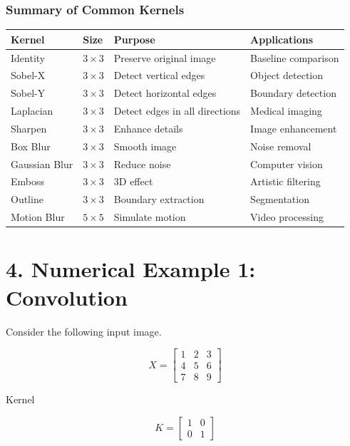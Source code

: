 \documentclass[11pt]{article}
\renewcommand{\arraystretch}{1.3}
\begin{document}
\subsubsection*{Summary of Common Kernels}

\begin{center}
\renewcommand{\arraystretch}{1.3}
\begin{tabular}{|p{3cm}|p{2cm}|p{4cm}|p{4cm}|}
\hline
\textbf{Kernel} & \textbf{Size} & \textbf{Purpose} & \textbf{Applications}\\
\hline
Identity & $3\times3$ & Preserve original image & Baseline comparison\\
\hline
Sobel-X & $3\times3$ & Detect vertical edges & Object detection\\
\hline
Sobel-Y & $3\times3$ & Detect horizontal edges & Boundary detection\\
\hline
Laplacian & $3\times3$ & Detect edges in all directions & Medical imaging\\
\hline
Sharpen & $3\times3$ & Enhance details & Image enhancement\\
\hline
Box Blur & $3\times3$ & Smooth image & Noise removal\\
\hline
Gaussian Blur & $3\times3$ & Reduce noise & Computer vision\\
\hline
Emboss & $3\times3$ & 3D effect & Artistic filtering\\
\hline
Outline & $3\times3$ & Boundary extraction & Segmentation\\
\hline
Motion Blur & $5\times5$ & Simulate motion & Video processing\\
\hline
\end{tabular}
\end{center}


\section*{4. Numerical Example 1: Convolution}

Consider the following input image.

\[
X=
\begin{bmatrix}
1&2&3\\
4&5&6\\
7&8&9
\end{bmatrix}
\]

Kernel

\[
K=
\begin{bmatrix}
1&0\\
0&1
\end{bmatrix}
\]
\end{document}
